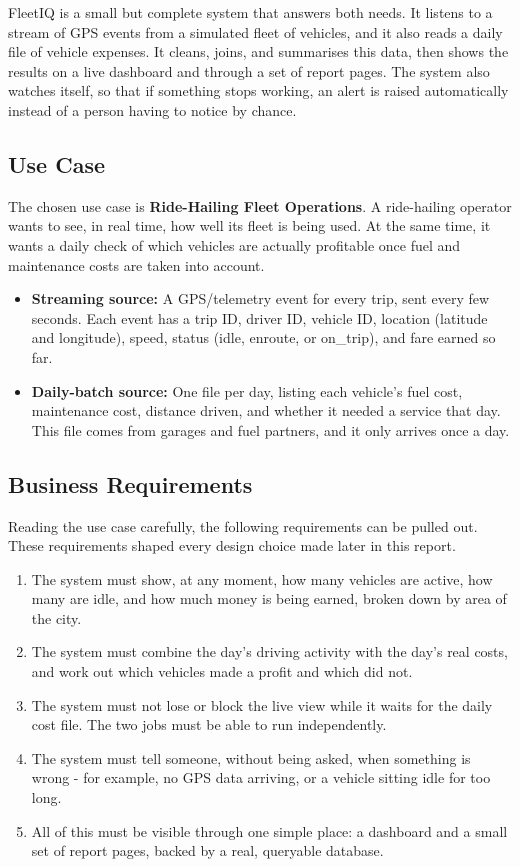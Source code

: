 \documentclass[12pt,a4paper]{article}
\begin{document}
FleetIQ is a small but complete system that answers both needs. It listens to
a stream of GPS events from a simulated fleet of vehicles, and it also reads
a daily file of vehicle expenses. It cleans, joins, and summarises this data,
then shows the results on a live dashboard and through a set of report
pages. The system also watches itself, so that if something stops working,
an alert is raised automatically instead of a person having to notice by
chance.

\subsection{Use Case}

The chosen use case is \textbf{Ride-Hailing Fleet Operations}. A ride-hailing
operator wants to see, in real time, how well its fleet is being used. At
the same time, it wants a daily check of which vehicles are actually
profitable once fuel and maintenance costs are taken into account.

\begin{itemize}
  \item \textbf{Streaming source:} A GPS/telemetry event for every trip,
    sent every few seconds. Each event has a trip ID, driver ID, vehicle ID,
    location (latitude and longitude), speed, status (idle, enroute, or
    on\_trip), and fare earned so far.
  \item \textbf{Daily-batch source:} One file per day, listing each
    vehicle's fuel cost, maintenance cost, distance driven, and whether it
    needed a service that day. This file comes from garages and fuel
    partners, and it only arrives once a day.
\end{itemize}

\subsection{Business Requirements}

Reading the use case carefully, the following requirements can be pulled
out. These requirements shaped every design choice made later in this
report.

\begin{enumerate}
  \item The system must show, at any moment, how many vehicles are active,
    how many are idle, and how much money is being earned, broken down by
    area of the city.
  \item The system must combine the day's driving activity with the day's
    real costs, and work out which vehicles made a profit and which did not.
  \item The system must not lose or block the live view while it waits for
    the daily cost file. The two jobs must be able to run independently.
  \item The system must tell someone, without being asked, when something is
    wrong - for example, no GPS data arriving, or a vehicle sitting idle
    for too long.
  \item All of this must be visible through one simple place: a dashboard
    and a small set of report pages, backed by a real, queryable database.
\end{enumerate}
\end{document}
